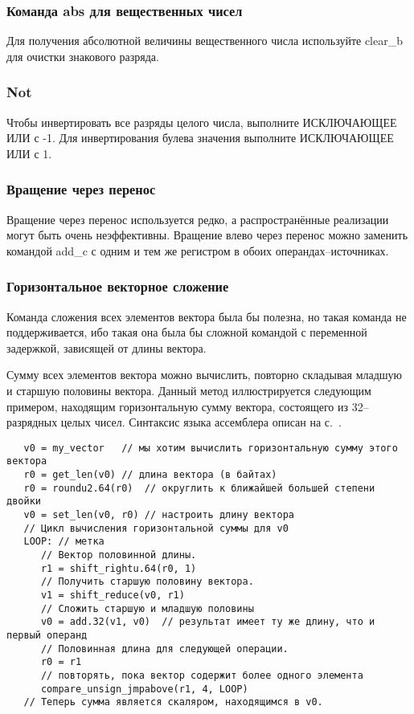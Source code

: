 \documentclass[forwardcom.tex]{subfiles}
\begin{document}
\subsubsection{Команда abs для вещественных чисел}
Для получения абсолютной величины вещественного числа используйте clear\_b для очистки знакового разряда.

\subsubsection{Not}
Чтобы инвертировать все разряды целого числа, выполните ИСКЛЮЧАЮЩЕЕ ИЛИ с -1. Для инвертирования булева значения выполните ИСКЛЮЧАЮЩЕЕ ИЛИ с 1.

\subsubsection{Вращение через перенос}
Вращение через перенос используется редко, а распространённые реализации могут быть очень неэффективны. Вращение влево через перенос можно заменить командой  add\_c с одним и тем же регистром в обоих операндах--источниках.

\subsubsection{Горизонтальное векторное сложение} \label{horizontalVectorAdd}
Команда сложения всех элементов вектора была бы полезна, но такая команда не поддерживается, ибо такая она была бы сложной командой с переменной задержкой, зависящей от длины вектора.

Сумму всех элементов вектора можно вычислить, повторно складывая младшую и старшую половины вектора. Данный метод иллюстрируется следующим примером, находящим горизонтальную сумму вектора, состоящего из 32--разрядных целых чисел. Синтаксис языка ассемблера описан на с.~\pageref{assemblySyntax}.
\begin{verbatim}
   v0 = my_vector   // мы хотим вычислить горизонтальную сумму этого вектора
   r0 = get_len(v0) // длина вектора (в байтах)
   r0 = roundu2.64(r0)  // округлить к ближайшей большей степени двойки
   v0 = set_len(v0, r0) // настроить длину вектора
   // Цикл вычисления горизонтальной суммы для v0
   LOOP: // метка
      // Вектор половинной длины.
      r1 = shift_rightu.64(r0, 1)
      // Получить старшую половину вектора.
      v1 = shift_reduce(v0, r1)
      // Сложить старшую и младшую половины
      v0 = add.32(v1, v0)  // результат имеет ту же длину, что и первый операнд
      // Половинная длина для следующей операции.
      r0 = r1
      // повторять, пока вектор содержит более одного элемента
      compare_unsign_jmpabove(r1, 4, LOOP)      
   // Теперь сумма является скаляром, находящимся в v0.
\end{verbatim}
\end{document}
